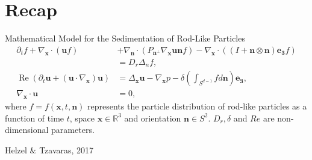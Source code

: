 \section{Recap}

\begin{frame}{Mathematical Model for the Sedimentation of Rod-Like Particles}
	\scriptsize
{}
\begin{align*}
\partial_t f+ \nabla_{\boldsymbol{x}} \cdot(\boldsymbol{u} f) & +\nabla_{\boldsymbol{n}} \cdot\left(P_{\boldsymbol{n}^{\perp}} \nabla_{\boldsymbol{x}} \boldsymbol{u} \boldsymbol{n} f\right)- \nabla_{\boldsymbol{x}} \cdot\left((I+\boldsymbol{n} \otimes \boldsymbol{n}) \boldsymbol{e_3} f\right) \\
	& =D_r \Delta_n f, \\
	\operatorname{Re}\left(\partial_t \boldsymbol{u}+\left(\boldsymbol{u} \cdot \nabla_{\boldsymbol{x}}\right) \boldsymbol{u}\right) & =\Delta_{\boldsymbol{x}} \boldsymbol{u}-\nabla_{\boldsymbol{x}} p-\delta \left(\int_{S^{d-1}} f d \boldsymbol{n} \right) \boldsymbol{e_3}, \\
	\nabla_{\boldsymbol{x}} \cdot \boldsymbol{u} & =0,
\end{align*}
where $f = f(\boldsymbol{x}, t, \boldsymbol{n})$ represents the particle distribution of rod-like particles as a function of time $t$, space $\boldsymbol{x} \in \mathbb{R}^3$ and orientation $\boldsymbol{n} \in  S^2$. 
$D_r, \delta$ and $Re$ are non-dimensional parameters.
\begin{beamercolorbox}[sep=1em,wd=\linewidth,right]{}
	\tiny{Helzel $\&$ Tzavaras, 2017}
\end{beamercolorbox}
\end{frame}


